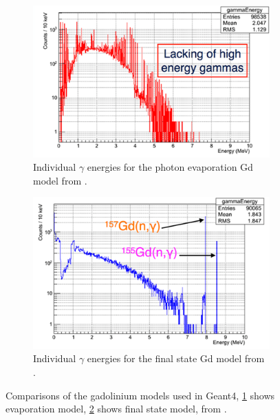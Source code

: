 \documentclass[12pt,a4paper]{article}
\begin{document}
\begin{figure}[H]
\centering
\begin{subfigure}{.5\textwidth}
  \centering
  \includegraphics[width=\linewidth]{evaporation_gdmodel.png}
  \captionsetup{width=.9\linewidth}
  \caption{Individual $\gamma$ energies for the photon evaporation Gd model from \cite{Gd_models}.}
  \label{evap_gd}
\end{subfigure}%
\begin{subfigure}{.5\textwidth}
  \centering
  \includegraphics[width=\linewidth]{finalstate_gdmodel.png}
  \captionsetup{width=.9\linewidth}
  \caption{Individual $\gamma$ energies for the final state Gd model from \cite{Gd_models}.}
  \label{finalst_gd}
\end{subfigure}
\caption{Comparisons of the gadolinium models used in Geant4, \ref{evap_gd} shows evaporation model, \ref{finalst_gd} shows final state model, from \cite{Gd_models}.}
\label{evap_fnst_gd}
\end{figure}
\end{document}
